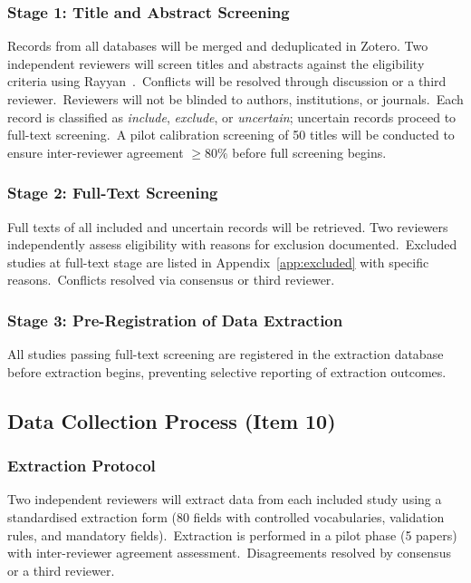 \subsubsection{Stage 1: Title and Abstract Screening}

Records from all databases will be merged and deduplicated in Zotero. Two independent reviewers will screen titles and abstracts against the eligibility criteria using Rayyan~\cite{ouzzani2016rayyan}.\ Conflicts will be resolved through discussion or a third reviewer.\ Reviewers will not be blinded to authors, institutions, or journals.\ Each record is classified as \textit{include}, \textit{exclude}, or \textit{uncertain}; uncertain records proceed to full-text screening.\ A pilot calibration screening of 50 titles will be conducted to ensure inter-reviewer agreement $\geq 80\%$ before full screening begins.

\subsubsection{Stage 2: Full-Text Screening}

Full texts of all included and uncertain records will be retrieved. Two reviewers independently assess eligibility with reasons for exclusion documented.\ Excluded studies at full-text stage are listed in Appendix~\ref{app:excluded} with specific reasons.\ Conflicts resolved via consensus or third reviewer.

\subsubsection{Stage 3: Pre-Registration of Data Extraction}

All studies passing full-text screening are registered in the extraction database before extraction begins, preventing selective reporting of extraction outcomes.

\subsection{Data Collection Process (Item 10)}

\subsubsection{Extraction Protocol}

Two independent reviewers will extract data from each included study using a standardised extraction form (80 fields with controlled vocabularies, validation rules, and mandatory fields).\ Extraction is performed in a pilot phase (5 papers) with inter-reviewer agreement assessment.\ Disagreements resolved by consensus or a third reviewer.

